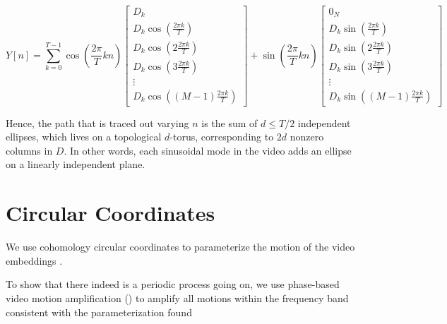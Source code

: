 \documentclass[a4paper,UKenglish]{lipics}
\begin{document}
\begin{equation}
Y[n] = \sum_{k = 0}^{T-1} \cos \left( \frac{2 \pi}{T} k n \right) \left[ \begin{array}{c} D_k \\ D_k \cos \left( \frac{2 \pi k}{T} \right) \\ D_k \cos \left( 2 \frac{2 \pi k}{T} \right) \\ D_k \cos \left( 3 \frac{2 \pi k}{T} \right) \\ \vdots \\ D_k \cos \left( (M-1) \frac{2 \pi k}{T} \right) \end{array} \right] + \sin \left( \frac{2 \pi}{T} k n \right) \left[ \begin{array}{c} 0_N \\ D_k \sin \left( \frac{2 \pi k}{T} \right) \\ D_k \sin \left( 2 \frac{2 \pi k}{T} \right) \\ D_k \sin \left( 3 \frac{2 \pi k}{T} \right) \\ \vdots \\ D_k \sin \left( (M-1) \frac{2 \pi k}{T} \right) \end{array} \right]
\end{equation}



Hence, the path that is traced out varying $n$ is the sum of $d \leq T/2$ independent ellipses, which lives on a topological $d$-torus, corresponding to $2d$ nonzero columns in $D$.  In other words, each sinusoidal mode in the video adds an ellipse on a linearly independent plane.


\section{Circular Coordinates}


We use cohomology circular coordinates to parameterize the motion of the video embeddings \cite{de2011persistent}.

To show that there indeed is a periodic process going on, we use phase-based video motion amplification (\cite{wadhwa2013phase}) to amplify all motions within the frequency band consistent with the parameterization found 






\end{document}
